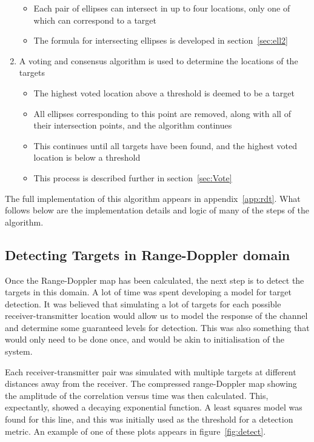 \documentclass[12pt,openany,a4paper]{book}
\begin{document}
\begin{enumerate}
\begin{itemize}
		\item{Each pair of ellipses can intersect in up to four locations, only one of which can correspond to a target}
		\item{The formula for intersecting ellipses is developed in section~\ref{sec:ell2}}
	\end{itemize}
	\item{A voting and consensus algorithm is used to determine the locations of the targets}
	\begin{itemize}
		\item{The highest voted location above a threshold is deemed to be a target}
		\item{All ellipses corresponding to this point are removed, along with all of their intersection points, and the algorithm continues}
		\item{This continues until all targets have been found, and the highest voted location is below a threshold}
		\item{This process is described further in section~\ref{sec:Vote}}
	\end{itemize}
\end{enumerate}

The full implementation of this algorithm appears in appendix~\ref{app:rdt}. What follows below are the implementation details and logic of many of the steps of the algorithm.

\subsection{Detecting Targets in Range-Doppler domain}
\label{sec:detectT}
Once the Range-Doppler map has been calculated, the next step is to detect the targets in this domain. A lot of time was spent developing a model for target detection. It was believed that simulating a lot of targets for each possible receiver-transmitter location would allow us to model the response of the channel and determine some guaranteed levels for detection. This was also something that would only need to be done once, and would be akin to initialisation of the system.

\bigskip

Each receiver-transmitter pair was simulated with multiple targets at different distances away from the receiver. The compressed range-Doppler map showing the amplitude of the correlation versus time was then calculated. This, expectantly, showed a decaying exponential function. A least squares model was found for this line, and this was initially used as the threshold for a detection metric. An example of one of these plots appears in figure~\ref{fig:detect}.
\end{document}
